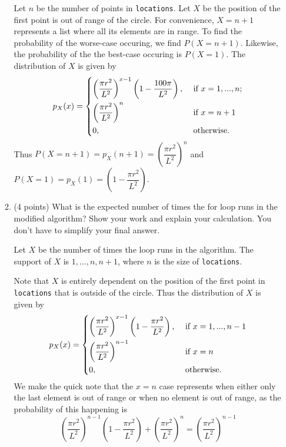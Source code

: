 \documentclass{assignment-263}
\begin{document}
\begin{enumerate}
\begin{enumerate}
    Let \(n\) be the number of points in \verb|locations|. Let \(X\) be the position of the first point is out of range of the circle. For convenience, \(X = n + 1\) represents a list where all its elements are in range. To find the probability of the worse-case occuring, we find \(P(X = n + 1)\). Likewise, the probability of the the best-case occuring is \(P(X = 1)\). The distribution of \(X\) is given by
    \[
      p_X(x) = \begin{dcases}
        \left( \dfrac{\pi r^2}{L^2} \right)^{x-1} \left( 1 - \dfrac{100\pi}{L^2} \right), &\text{ if } x = 1, ..., n ;\\
        \left( \dfrac{\pi r^2}{L^2} \right)^{n} &\text{ if } x = n + 1 \\
        0, &\text{ otherwise} .
      \end{dcases}
    \]
    Thus \(P(X = n + 1) = p_X(n + 1) = \left( \dfrac{\pi r^2}{L^2} \right)^{n}\) and \(P(X = 1) = p_X(1) = \left( 1 - \dfrac{\pi r^2}{L^2} \right)\).


    \item (4 points) What is the expected number of times the for loop runs in the modified algorithm? Show your work and explain your calculation. You don't have to simplify your final answer.
    
    Let \(X\) be the number of times the loop runs in the algorithm. The support of \(X\) is \(1, ..., n, n + 1\), where \(n\) is the size of \verb|locations|.

    Note that \(X\) is entirely dependent on the position of the first point in \verb|locations| that is outside of the circle. Thus the distribution of \(X\) is given by
    \[
      p_X(x) = \begin{dcases}
        \left( \dfrac{\pi r^2}{L^2} \right)^{x-1} \left( 1 - \dfrac{\pi r^2}{L^2} \right), &\text{ if } x = 1, ..., n - 1 \\
        \left( \dfrac{\pi r^2}{L^2} \right)^{n-1} &\text{ if } x = n \\
        0, &\text{ otherwise} .
      \end{dcases}
    \]
    We make the quick note that the \(x = n\) case represents when either only the last element is out of range or when no element is out of range, as the probability of this happening is
    \[
      \left( \dfrac{\pi r^2}{L^2} \right)^{n-1} \left( 1 - \dfrac{\pi r^2}{L^2} \right) + \left( \dfrac{\pi r^2}{L^2} \right)^{n} = \left( \dfrac{\pi r^2}{L^2} \right)^{n-1}
    \]


\end{enumerate}
\end{enumerate}
\end{document}
